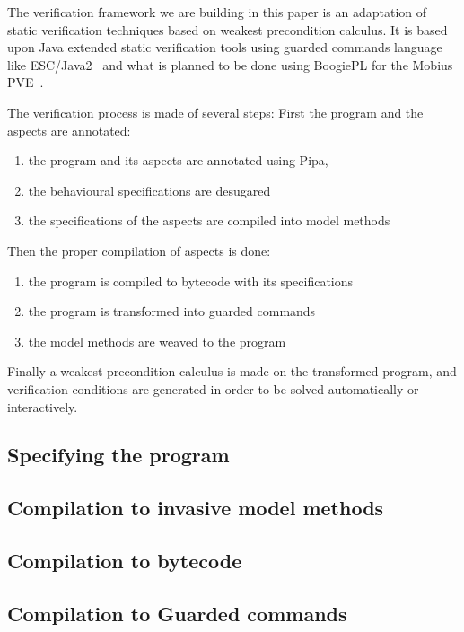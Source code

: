 The verification framework we are building in this paper is an
adaptation of static verification techniques based on weakest
precondition calculus. It is based upon Java extended static verification
tools using guarded commands language like ESC/Java2~\cite{CokK04} and
what is planned to be done using BoogiePL for the Mobius
PVE~\cite{MobiusPVE07}.


The verification process is made of several steps:
First the program and the aspects are annotated:
\begin{enumerate}
\item the program and its aspects are annotated using Pipa,
\item the behavioural specifications are desugared
\item the specifications of the aspects are compiled into model
methods
\end{enumerate}
Then the proper compilation of aspects is done:
\begin{enumerate}
\item the program is compiled to bytecode with its specifications
\item the program is transformed into guarded commands
\item the model methods are weaved to the program
\end{enumerate}
Finally a weakest precondition calculus is made on the transformed
program, and verification conditions are generated in order to be
solved automatically or interactively.


\subsection{Specifying the program}


\subsection{Compilation to invasive model methods}


\subsection{Compilation to bytecode}


\subsection{Compilation to Guarded commands}
\label{gc}


